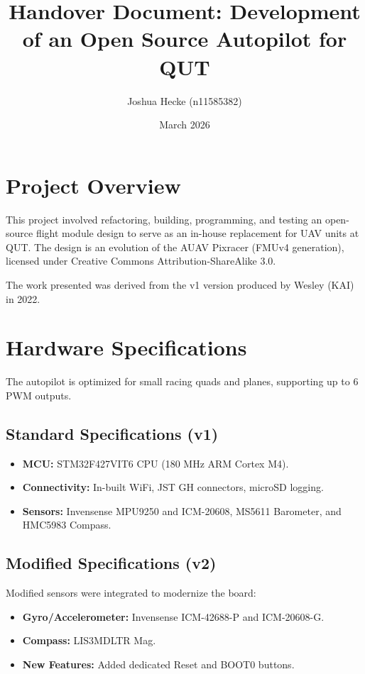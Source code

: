 \documentclass[12pt,a4paper]{article}
\title{Handover Document: Development of an Open Source Autopilot for QUT}
\author{Joshua Hecke (n11585382)}
\date{March 2026}
\begin{document}
\maketitle

\section{Project Overview}
This project involved refactoring, building, programming, and testing an open-source flight module design to serve as an in-house replacement for UAV units at QUT. The design is an evolution of the AUAV Pixracer (FMUv4 generation), licensed under Creative Commons Attribution-ShareAlike 3.0. 

The work presented was derived from the v1 version produced by Wesley (KAI) in 2022.

\section{Hardware Specifications}
The autopilot is optimized for small racing quads and planes, supporting up to 6 PWM outputs.

\subsection{Standard Specifications (v1)}
\begin{itemize}
    \item \textbf{MCU:} STM32F427VIT6 CPU (180 MHz ARM Cortex M4).
    \item \textbf{Connectivity:} In-built WiFi, JST GH connectors, microSD logging.
    \item \textbf{Sensors:} Invensense MPU9250 and ICM-20608, MS5611 Barometer, and HMC5983 Compass.
\end{itemize}

\subsection{Modified Specifications (v2)}
Modified sensors were integrated to modernize the board:
\begin{itemize}
    \item \textbf{Gyro/Accelerometer:} Invensense ICM-42688-P and ICM-20608-G.
    \item \textbf{Compass:} LIS3MDLTR Mag.
    \item \textbf{New Features:} Added dedicated Reset and BOOT0 buttons.
\end{itemize}
\end{document}
